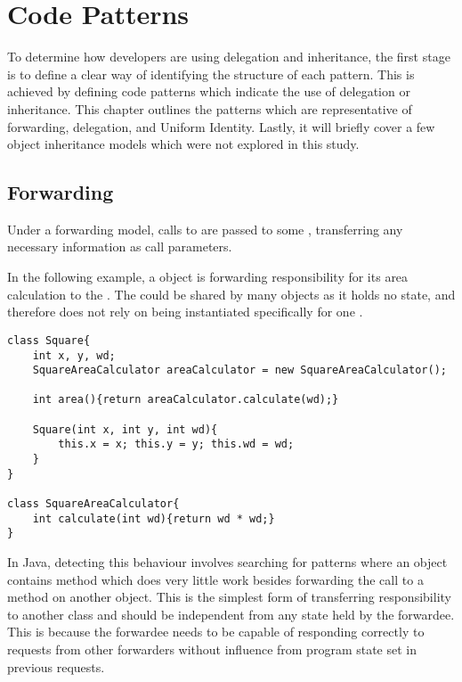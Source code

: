 \chapter{Code Patterns}\label{C:bg}
To determine how developers are using delegation and inheritance, the first stage is to define a clear way of identifying the structure of each pattern. This is achieved by defining code patterns which indicate the use of delegation or inheritance. This chapter outlines the patterns which are representative of forwarding, delegation, and Uniform Identity. Lastly, it will briefly cover a few object inheritance models which were not explored in this study.

\section{Forwarding}
\label{sec:forwarding}
Under a forwarding model, calls to  are passed to some , transferring any necessary information as call parameters.
\newline

In the following example, a  object is forwarding responsibility for its area calculation to the . The  could be shared by many  objects as it holds no state, and therefore does not rely on being instantiated specifically for one .

\begin{lstlisting}
class Square{
	int x, y, wd;
	SquareAreaCalculator areaCalculator = new SquareAreaCalculator();

	int area(){return areaCalculator.calculate(wd);}

	Square(int x, int y, int wd){
		this.x = x; this.y = y; this.wd = wd;
	}
}

class SquareAreaCalculator{
	int calculate(int wd){return wd * wd;}
}
\end{lstlisting}

In Java, detecting this behaviour involves searching for patterns where an object contains method which does very little work besides forwarding the call to a method on another object. This is the simplest form of transferring responsibility to another class and should be independent from any state held by the forwardee. This is because the forwardee needs to be capable of responding correctly to requests from other forwarders without influence from program state set in previous requests.
\newline

